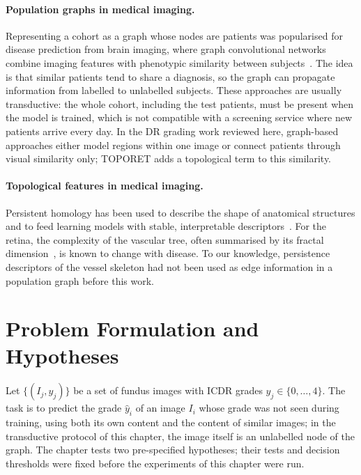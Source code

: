 \paragraph{Population graphs in medical imaging.}
Representing a cohort as a graph whose nodes are patients was popularised for disease
prediction from brain imaging, where graph convolutional networks combine imaging features
with phenotypic similarity between subjects~\cite{parisot2018disease}. The idea is that
similar patients tend to share a diagnosis, so the graph can propagate information from
labelled to unlabelled subjects. These approaches are usually transductive: the whole
cohort, including the test patients, must be present when the model is trained, which is
not compatible with a screening service where new patients arrive every day. In the DR
grading work reviewed here, graph-based approaches either model regions within one image
or connect patients through visual similarity only; TOPORET adds a topological term to
this similarity.

\paragraph{Topological features in medical imaging.}
Persistent homology has been used to describe the shape of anatomical structures and to
feed learning models with stable, interpretable descriptors~\cite{hofer2017topological,
carriere2020perslay}. For the retina, the complexity of the vascular tree, often summarised
by its fractal dimension~\cite{masters2004fractal}, is known to change with disease. To our
knowledge, persistence descriptors of the vessel skeleton had not been used as edge
information in a population graph before this work.

\section{Problem Formulation and Hypotheses}
\label{sec:ch3-problem}\label{sec:hyp}

Let $\{(I_j,y_j)\}$ be a set of fundus images with ICDR grades $y_j\in\{0,\ldots,4\}$. The
task is to predict the grade $\hat y_i$ of an image $I_i$ whose grade was not seen during
training, using both its own content and the content of similar images; in the
transductive protocol of this chapter, the image itself is an unlabelled node of the
graph. The chapter tests
two pre-specified hypotheses; their tests and decision thresholds were fixed before the
experiments of this chapter were run.

